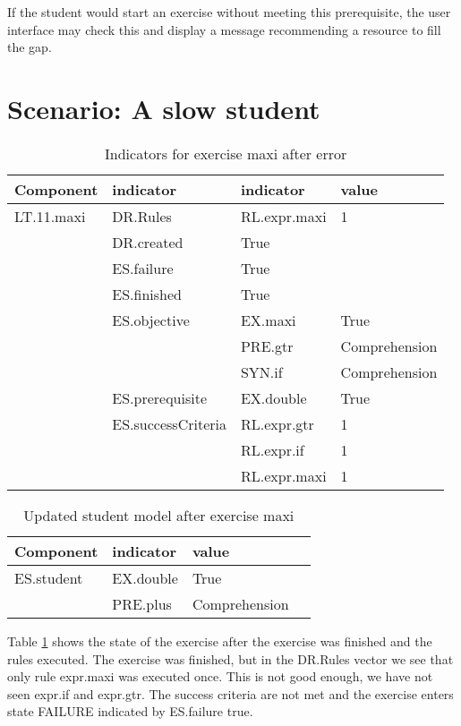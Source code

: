 If the student would start an exercise without meeting this prerequisite, the user interface
may check this and display a message recommending a resource to fill the gap.


\section{Scenario: A slow student}

 \label{sec:slowStudent}
\begin{table}[H]
\begin{tabular}{| l | l | l | l |}
\hline
Component & indicator & indicator & value\\
\hline
LT.11.maxi  & DR.Rules & RL.expr.maxi & 1\\
& DR.created & True & \\
& ES.failure &True & \\
& ES.finished &True & \\
&ES.objective & EX.maxi & True\\
& & PRE.gtr &  Comprehension\\
& & SYN.if & Comprehension\\
& ES.prerequisite &EX.double & True\\

& ES.successCriteria & RL.expr.gtr & 1\\
& & RL.expr.if & 1 \\
& & RL.expr.maxi & 1\\

\hline
\end{tabular}
\caption{Indicators for exercise maxi after error}
\label{maxi.error.ex}
\end{table}


\begin{table}[H]
\begin{tabular}{| l | l | l | l}
\hline
Component & indicator & value\\
\hline
ES.student & EX.double & True \\
& PRE.plus & Comprehension  \\
\hline
\end{tabular}
\caption{Updated student model after exercise maxi}
\label{maxi.error.student}
\end{table}

Table \ref{maxi.error.ex} shows the state of the exercise after the exercise was finished and the rules executed.
The exercise was finished, but in the DR.Rules vector we see that only rule expr.maxi was executed once.
This is not good enough, we have not seen expr.if and expr.gtr.
The success criteria are not met and the exercise enters state FAILURE indicated by ES.failure true.

